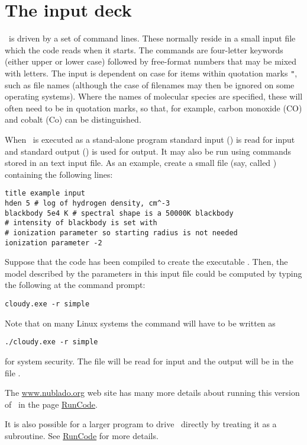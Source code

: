 \section{The input deck}

\noindent \Cloudy\ is driven by a set of command lines.
These normally reside in a small input file which the code reads
when it starts.
The commands are four-letter keywords (either
upper or lower case) followed by free-format numbers that
may be mixed with letters.  The input is dependent on case for items
within quotation marks \verb|"|, such as file names (although the
case of filenames may then be ignored on some operating
systems).  Where the names of 
molecular species are specified, these will often need to be in quotation
marks, so that, for example, carbon monoxide (CO) and cobalt (Co) can be
distinguished.

When \Cloudy\ is executed as a stand-alone program standard input
() is read for input and standard output
() is used for output.  It may also be run using
commands stored in an text input file.  As an example, create a small
file (say, called ) containing the following
lines:

\begin{verbatim}
title example input
hden 5 # log of hydrogen density, cm^-3
blackbody 5e4 K # spectral shape is a 50000K blackbody
# intensity of blackbody is set with
# ionization parameter so starting radius is not needed
ionization parameter -2
\end{verbatim}
Suppose that the code has been compiled to create the executable .
Then, the model described by the parameters in this input file could be
computed by typing the following at the command prompt:
\begin{verbatim}
cloudy.exe -r simple
\end{verbatim}
Note that on many Linux systems the command will have to be written as
\begin{verbatim}
./cloudy.exe -r simple
\end{verbatim}
for system security.  
The file  will be read for input and the output will be in the file
.  

The \href{http://www.nublado.org}{www.nublado.org} web site has many more details
about running this version of \Cloudy\ in the page
\href{http://trac.nublado.org/wiki/RunCode}{RunCode}.

It is also possible for a larger program to drive \Cloudy\ directly by
treating it as a subroutine. 
See \href{http://trac.nublado.org/wiki/RunCode}{RunCode} for more details.

